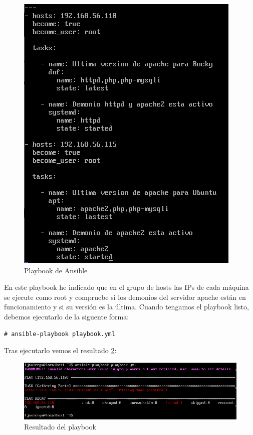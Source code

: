 \begin{figure}[H]
  \centering
  \includegraphics[scale=0.8]{Captura24}
  \caption{Playbook de Ansible}
  \label{fig:ansible-playbook}
\end{figure}

En este playbook he indicado que en el grupo de hosts las IPs de cada máquina se ejecute como root y compruebe si los demonios del servidor apache están en funcionamiento y si su versión es la última. Cuando tengamos el playbook listo, debemos ejecutarlo de la siguente forma:

\begin{lstlisting}
# ansible-playbook playbook.yml
\end{lstlisting}

Tras ejecutarlo vemos el resultado \ref{fig:ansible-playbook-res}: 

\begin{figure}[H]
  \centering
  \includegraphics[scale=0.8]{Captura25}
  \caption{Resultado del playbook}
  \label{fig:ansible-playbook-res}
\end{figure}


